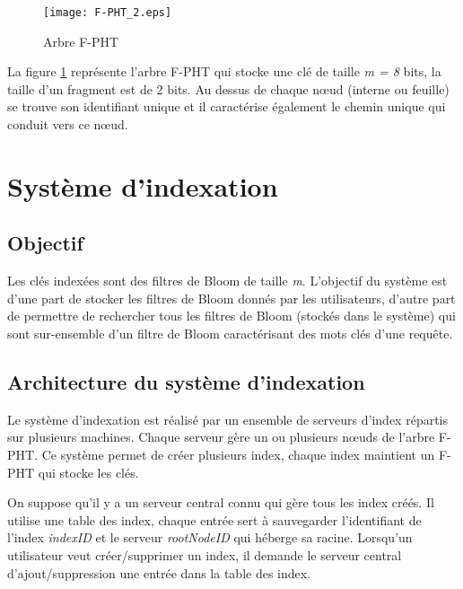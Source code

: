 \documentclass[a4paper,11pt]{report}
\begin{document}
	\begin{figure}[!htbp]
	\centering
	\texttt{[image: F-PHT\_2.eps]}
	\caption{Arbre F-PHT}
	\label{F-PHT2}
	\end{figure}	
	
	La figure \ref{F-PHT2} représente l'arbre F-PHT qui stocke une clé de taille \textit{m = 8} bits, la taille d'un fragment est de 2 bits. Au dessus de chaque nœud (interne ou feuille) se trouve son identifiant unique et il caractérise également le chemin unique qui conduit vers ce nœud.
	
\chapter{Système d'indexation}
\section{Objectif}
	Les clés indexées sont des filtres de Bloom de taille \textit{m}.
	L'objectif du système est d'une part de stocker les filtres de Bloom donnés par les utilisateurs, d'autre part de permettre de rechercher tous les filtres de Bloom (stockés dans le système) qui sont sur-ensemble d'un filtre de Bloom caractérisant des mots clés d'une requête.

\section{Architecture du système d'indexation}
	Le système d'indexation est réalisé par un ensemble de serveurs d'index répartis sur plusieurs machines. Chaque serveur gère un ou plusieurs nœuds de l'arbre F-PHT. Ce système permet de créer plusieurs index, chaque index maintient  un F-PHT qui stocke les clés.
	
	On suppose qu'il y a un serveur central connu qui gère tous les index créés. Il utilise une table des index, chaque entrée sert à sauvegarder l'identifiant de l'index \textit{indexID} et le serveur \textit{rootNodeID} qui héberge sa racine. Lorsqu'un utilisateur veut créer/supprimer un index, il demande le serveur central d'ajout/suppression une entrée dans la table des index.
\end{document}
